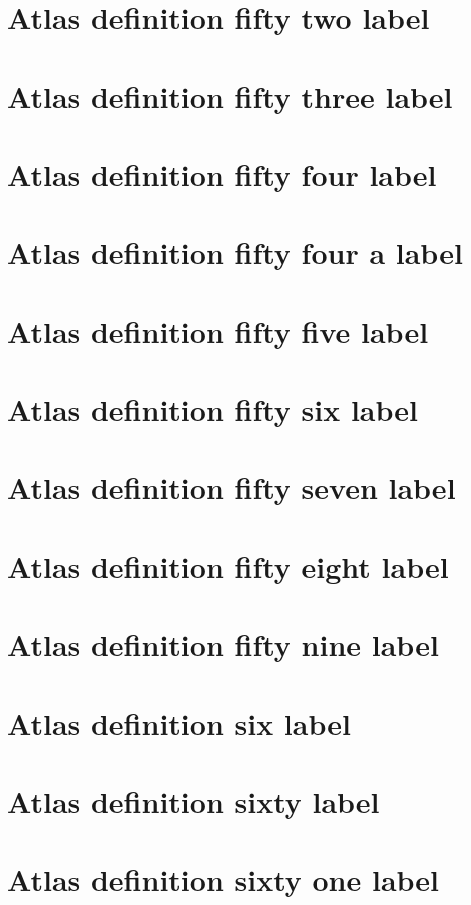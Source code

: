 \documentclass[11pt]{article}
\theoremstyle{definition}
\begin{document}
\section{Atlas definition fifty two label}
\label{ll:labels:atlas-d52}
\section{Atlas definition fifty three label}
\label{ll:labels:atlas-d53}
\section{Atlas definition fifty four label}
\label{ll:labels:atlas-d54}
\section{Atlas definition fifty four a label}
\label{ll:labels:atlas-d54a}
\section{Atlas definition fifty five label}
\label{ll:labels:atlas-d55}
\section{Atlas definition fifty six label}
\label{ll:labels:atlas-d56}
\section{Atlas definition fifty seven label}
\label{ll:labels:atlas-d57}
\section{Atlas definition fifty eight label}
\label{ll:labels:atlas-d58}
\section{Atlas definition fifty nine label}
\label{ll:labels:atlas-d59}
\section{Atlas definition six label}
\label{ll:labels:atlas-d6}
\section{Atlas definition sixty label}
\label{ll:labels:atlas-d60}
\section{Atlas definition sixty one label}
\label{ll:labels:atlas-d61}
\end{document}
